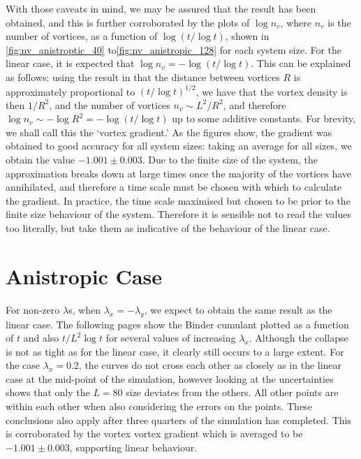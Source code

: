 With those caveats in mind, we may be assured that the result has been obtained, and this is further corroborated by the plots of $\log n_v$, where $n_v$ is the number of vortices, as a function of $\log (t / \log t)$, shown in  \ref{fig:nv_anistroptic_40} to\ref{fig:nv_anistropic_128}  for each system size. 
For the linear case, it is expected that $\log n_v = -\log (t / \log t)$. 
This can be explained as follows: using the result in \cite{PhysRevLett.84.1503} that the distance between vortices $R$ is approximately proportional to $ (t / \log t)^{1/2}$, we have that the vortex density is then $1/R^2$, and the number of vortices $n_v \sim L^2/R^2$, and therefore $\log n_v \sim -  \log R^2 = -\log(t/\log t)$ up to some additive constants. For brevity, we shall call this the `vortex gradient.'
As the figures show, the gradient was obtained to good accuracy for all system sizes: taking an average for all sizes, we obtain the value $-1.001 \pm 0.003$. Due to the finite size of the system, the approximation breaks down at large times once the majority of the vortices have annihilated, and therefore a time scale must be chosen with which to calculate the gradient. 
In practice, the time scale maximised but chosen to be prior to the finite size behaviour of the system. 
Therefore it is sensible not to read the values too literally, but take them as indicative of the behaviour of the linear case.                



\section{Anistropic Case} 
For non-zero $\lambda$s, when $\lambda_x = - \lambda_y$, we expect to obtain the same result as the linear case. The following pages show the Binder cumulant plotted as a function of $t$ and also $t/ L^2 \log t$ for several values of increasing $\lambda_x$. Although the collapse is not as tight as for the linear case, it clearly still occurs to a large extent. For the case $\lambda_x = 0.2$, the curves do not cross each other as closely as in the linear case at the mid-point of the simulation, however looking at the uncertainties shows that only the $L=80$ size deviates from the others. All other points are within each other when also considering the errors on the points. These conclusions also apply after three quarters of the simulation has completed. This is corroborated by the vortex vortex gradient which is averaged to be $-1.001 \pm 0.003$, supporting linear behaviour.

